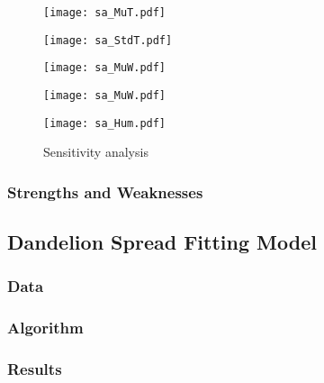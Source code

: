 \documentclass[12pt]{article}
\begin{document}
			\begin{figure}[htbp]
				\centering
				\begin{minipage}{0.04\textwidth}\end{minipage}
				\begin{minipage}{0.46\textwidth}
					\texttt{[image: sa\_MuT.pdf]}
				\end{minipage}
				\begin{minipage}{0.46\textwidth}
					\texttt{[image: sa\_StdT.pdf]}
				\end{minipage}
				\begin{minipage}{0.04\textwidth}\end{minipage}
				
				\begin{minipage}{0.04\textwidth}\end{minipage}
				\begin{minipage}{0.46\textwidth}
					\texttt{[image: sa\_MuW.pdf]}
				\end{minipage}
				\begin{minipage}{0.46\textwidth}
					\texttt{[image: sa\_MuW.pdf]}
				\end{minipage}
				\begin{minipage}{0.04\textwidth}\end{minipage}
				
				\texttt{[image: sa\_Hum.pdf]}
				\caption{Sensitivity analysis}
				\label{fig:sa}
			\end{figure}
			
		\subsubsection{Strengths and Weaknesses}
		
	\subsection{Dandelion Spread Fitting Model}
		
		\subsubsection{Data}
		
		\subsubsection{Algorithm}
		
		\subsubsection{Results}
		
\end{document}

